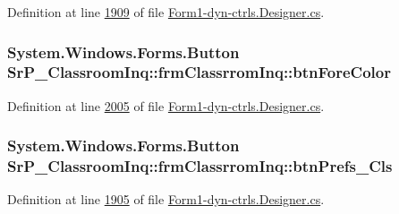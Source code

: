 \-Definition at line \hyperlink{_form1-dyn-ctrls_8_designer_8cs_source_l01909}{1909} of file \hyperlink{_form1-dyn-ctrls_8_designer_8cs_source}{\-Form1-\/dyn-\/ctrls.\-Designer.\-cs}.

\hypertarget{class_sr_p___classroom_inq_1_1frm_classrrom_inq_af3a459dee89d074c46f08528279e61e0}{
\subsubsection[{btn\-Fore\-Color}]{\setlength{\rightskip}{0pt plus 5cm}\-System.\-Windows.\-Forms.\-Button {\bf \-Sr\-P\-\_\-\-Classroom\-Inq\-::frm\-Classrrom\-Inq\-::btn\-Fore\-Color}}}
\label{class_sr_p___classroom_inq_1_1frm_classrrom_inq_af3a459dee89d074c46f08528279e61e0}


\-Definition at line \hyperlink{_form1-dyn-ctrls_8_designer_8cs_source_l02005}{2005} of file \hyperlink{_form1-dyn-ctrls_8_designer_8cs_source}{\-Form1-\/dyn-\/ctrls.\-Designer.\-cs}.

\hypertarget{class_sr_p___classroom_inq_1_1frm_classrrom_inq_ab11e101a873395b24e8894ac84d7d318}{
\subsubsection[{btn\-Prefs\-\_\-\-Cls}]{\setlength{\rightskip}{0pt plus 5cm}\-System.\-Windows.\-Forms.\-Button {\bf \-Sr\-P\-\_\-\-Classroom\-Inq\-::frm\-Classrrom\-Inq\-::btn\-Prefs\-\_\-\-Cls}}}
\label{class_sr_p___classroom_inq_1_1frm_classrrom_inq_ab11e101a873395b24e8894ac84d7d318}


\-Definition at line \hyperlink{_form1-dyn-ctrls_8_designer_8cs_source_l01905}{1905} of file \hyperlink{_form1-dyn-ctrls_8_designer_8cs_source}{\-Form1-\/dyn-\/ctrls.\-Designer.\-cs}.

